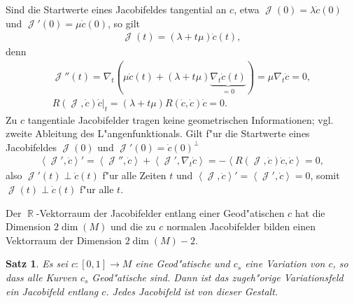 \documentclass[paper=A4, twoside, chapterprefix=true, bibliography=totoc, headsepline]{scrbook}
\DeclareMathOperator{\R}{\mathbb{R}}
\DeclareMathOperator{\calJ}{\mathcal{J}}
\theoremstyle{plain}
\newtheorem{Satz}[Dfn]{Satz}
\theoremstyle{nonumberplain}
\theoremstyle{empty}
\theoremstyle{break}
\begin{document}
Sind die Startwerte eines Jacobifeldes tangential an $c$, etwa $\calJ(0) =
\lambda \dot c(0)$ und $\calJ'(0) = \mu \dot c(0)$, so gilt
\begin{align*}
  \calJ(t) = (\lambda + t\mu)\dot c(t),
\end{align*}
denn
\begin{align*}
  \calJ''(t) = \nabla_t(\mu \dot c(t) + (\lambda + t \mu)\underbrace{\nabla_t\dot c(t)}_{=0}) = \mu\nabla_t\dot c = 0,\\
  \left.R(\calJ,\dot c)\dot c\right|_t = (\lambda + t\mu)R(\dot c, \dot c)\dot c = 0.
\end{align*}
Zu $c$ tangentiale Jacobifelder tragen keine geometrischen Informationen; vgl. zweite Ableitung des L"angenfunktionals.
Gilt f"ur die Startwerte eines Jacobifeldes $\calJ(0)$ und $\calJ'(0) = \dot c(0)^{\perp}$
\begin{align*}
  \left<\calJ',\dot c\right>' = \left<\calJ'',\dot c\right> + \left<\calJ', \nabla_t\dot c\right> = - \left<R(\calJ,\dot c)\dot c,\dot c\right> = 0,
\end{align*}
also $\calJ'(t) \perp \dot c(t)$ f"ur alle Zeiten $t$ und $\left<\calJ,\dot c\right>' = \left<\calJ',\dot c\right> = 0$, somit $\calJ(t) \perp \dot c(t)$ f"ur alle $t$.

Der $\R$-Vektorraum der Jacobifelder entlang einer Geod"atischen $c$ hat die Dimension $2 \dim(M)$ und die zu $c$ normalen Jacobifelder bilden einen Vektorraum der Dimension $2 \dim(M) - 2$.

\begin{Satz}\label{satz-9-5}
  Es sei $c \colon [0,1] \to M$ eine Geod"atische und $c_s$ eine Variation von $c$, so dass alle Kurven $c_s$ Geod"atische sind.
  Dann ist das zugeh"orige Variationsfeld ein Jacobifeld entlang $c$.
  Jedes Jacobifeld ist von dieser Gestalt.
\end{Satz}
\end{document}
